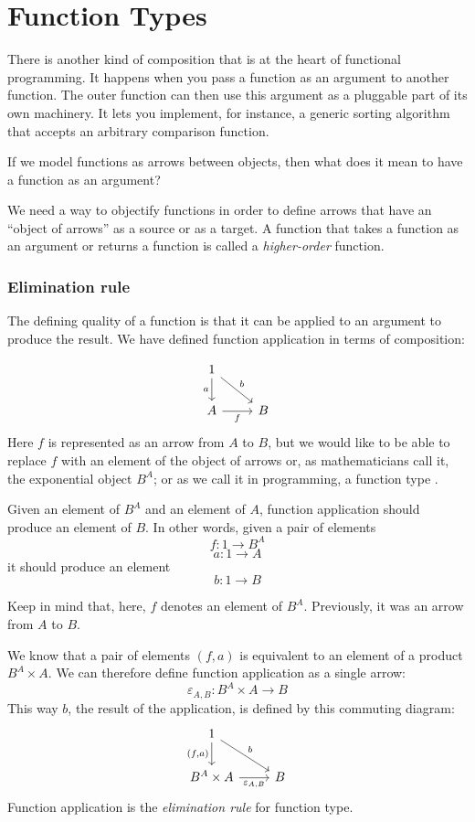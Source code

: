 \documentclass[DaoFP]{subfiles}
\begin{document}
\setcounter{chapter}{5}

\chapter{Function Types}

There is another kind of composition that is at the heart of functional programming. It happens when you pass a function as an argument to another function. The outer function can then use this argument as a pluggable part of its own machinery. It lets you implement, for instance, a generic sorting algorithm that accepts an arbitrary comparison function. 

If we model functions as arrows between objects, then what does it mean to have a function as an argument? 

We need a way to objectify functions in order to define arrows that have an ``object of arrows'' as a source or as a target. A function that takes a function as an argument or returns a function is called a \emph{higher-order} function.

\subsection{Elimination rule}

The defining quality of a function is that it can be applied to an argument to produce the result. We have defined function application in terms of composition:

\[
 \begin{tikzcd}
 1
 \arrow[d, "a"']
 \arrow[rd, "b"]
 \\
 A
 \arrow[r, "f"']
& B
 \end{tikzcd}
\]
Here $f$ is represented as an arrow from $A$ to $B$, but we would like to be able to replace $f$ with an element of the object of arrows or, as mathematicians call it, the exponential object $B^A$; or as we call it in programming, a function type . 

Given an element of $B^A$ and an element of $A$, function application should produce an element of $B$. In other words, given a pair of elements
\[f \colon 1 \to B^A\]
\[a \colon 1 \to A\]
it should produce an element
\[b \colon 1 \to B \]

Keep in mind that, here, $f$ denotes an element of $B^A$. Previously, it was an arrow from $A$ to $B$.

We know that a pair of elements $(f, a)$ is equivalent to an element of a product $B^A \times A$. We can therefore define function application as a single arrow:
\[\varepsilon_{A, B} \colon B^A \times A \to B\]
This way $b$, the result of the application, is defined by this commuting diagram:
\[
 \begin{tikzcd}
 1
 \arrow[d, "{(f, a)}"']
 \arrow[rd, "b"]
 \\
 B^A \times A
 \arrow[r, "\varepsilon_{A, B}"']
& B
 \end{tikzcd}
\]
Function application is the \emph{elimination rule} for function type. 
\end{document}
